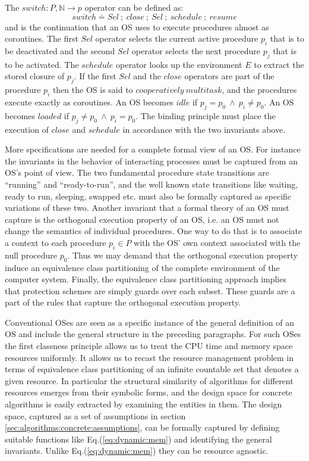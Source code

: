 \documentclass[draft]{article}
\def\names{\doteq}
\begin{document}
The $switch: P, \mathbb{N} \rightarrow p$ operator can be defined as:
\begin{equation}
  \label{eq:switch:op}
  switch \names Sel\ ;\ close\ ;\ Sel\ ;\ schedule\ ;\ resume
\end{equation}
and is the  continuation that an OS uses  to execute procedures almost
as coroutines.   The first $Sel$  operator selects the  current active
procedure  $p_i$  that is  to  be  deactivated  and the  second  $Sel$
operator selects  the next  procedure $p_j$ that  is to  be activated.
The $schedule$  operator looks up  the environment $E$ to  extract the
stored closure of $p_j$.  If the first $Sel$ and the $close$ operators
are part of the procedure $p_i$ then the OS is said to $cooperatively\
multitask$, and  the procedures execute exactly as  coroutines.  An OS
becomes $idle$ if $p_j = p_0\  \wedge\ p_i \not = p_0$.  An OS becomes
$loaded$  if  $p_j  \not =  p_0\  \wedge\  p_i  = p_0$.   The  binding
principle  must  place the  execution  of  $close$  and $schedule$  in
accordance  with the  two invariants  above.  

More specifications  are needed for a  complete formal view  of an OS.
For instance  the invariants in the behavior  of interacting processes
must  be captured from  an OS's  point of  view.  The  two fundamental
procedure state transitions  are ``running'' and ``ready-to-run'', and
the well known state transitions like waiting, ready to run, sleeping,
swapped etc. must also be  formally captured as specific variations of
these  two.  Another  invariant that  a formal  theory of  an  OS must
capture is the orthogonal execution property of an OS, i.e. an OS must
not change the semantics of individual procedures.  One way to do that
is to associate  a context to each procedure $p_i \in  P$ with the OS'
own context  associated with  the null procedure  $p_0$.  Thus  we may
demand that  the orthogonal  execution property induce  an equivalence
class partitioning of the complete environment of the computer system.
Finally,  the  equivalence class  partitioning  approach implies  that
protection schemes  are simply guards over each  subset.  These guards
are  a  part  of  the  rules that  capture  the  orthogonal  execution
property.

Conventional  OSes are  seen as  a  specific instance  of the  general
definition of an OS and include the general structure in the preceding
paragraphs.  For such OSes the  first classness principle allows us to
treat the CPU time and memory space resources uniformly.  It allows us
to  recast the  resource management  problem in  terms  of equivalence
class partitioning of  an infinite countable set that  denotes a given
resource.  In  particular the structural similarity  of algorithms for
different resources emerges from  their symbolic forms, and the design
space  for concrete algorithms  is easily  extracted by  examining the
entities in them.  The design  space, captured as a set of assumptions
in section  \ref{sec:algorithms:concrete:assumptions}, can be formally
captured by defining suitable functions like Eq.(\ref{eq:dynamic:mem})
and      identifying     the      general      invariants.      Unlike
Eq.(\ref{eq:dynamic:mem}) they can be resource agnostic.
\end{document}
